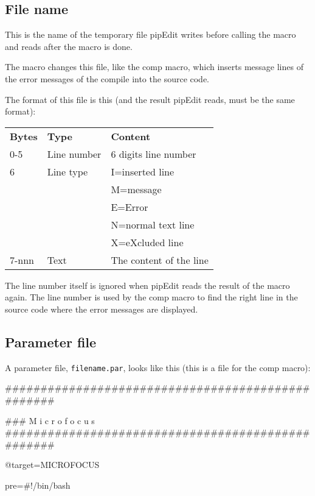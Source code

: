\documentclass{report}
\begin{document}
\subsection{File name}
This is the name of the temporary file pipEdit writes before calling the macro and reads after the macro is done.

The macro changes this file, like the comp macro, which inserts message lines of the error messages of the compile into the source code.

The format of this file is this (and the result pipEdit reads, must be the same format):

\begin{tabular}{l l l}
\textbf{Bytes} & \textbf{Type}        & \textbf{Content} \\
0-5            & Line number          & 6 digits line number \\
6              & Line type            & I=inserted line \\
               &                      & M=message\\
               &                      & E=Error \\
               &                      & N=normal text line \\
               &                      & X=eXcluded line \\
7-nnn          & Text                 & The content of the line \\
\end{tabular}


The line number itself is ignored when pipEdit reads the result of the macro again. The line number is used by the comp macro to find the right line in the source code where the error messages are displayed.

\pagebreak
\subsection{Parameter file}
A parameter file, \texttt{filename.par}, looks like this (this is a file for the comp macro):

\#\#\#\#\#\#\#\#\#\#\#\#\#\#\#\#\#\#\#\#\#\#\#\#\#\#\#\#\#\#\#\#\#\#\#\#\#\#\#\#\#\#\#\#\#\#\#\#\#\#

\#\#\# M i c r o f o c u s \#\#\#\#\#\#\#\#\#\#\#\#\#\#\#\#\#\#\#\#\#\#\#\#\#\#\#\#\#\#\#\#\#\#\#\#\#\#\#\#\#\#\#\#\#\#\#\#\#\#

@target=MICROFOCUS

pre=\#!/bin/bash
\end{document}
